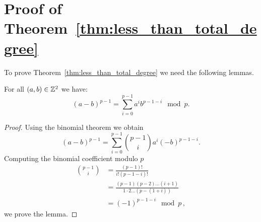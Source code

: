 \section{Proof of Theorem~\ref{thm:less_than_total_degree}}
\label{app:proof_thm_less_than_total_degree}
To prove Theorem~\ref{thm:less_than_total_degree} we need the following lemmas.
  \begin{lemma}\label{lem:difference_to_p-1}
    For all $(a,b)\in\mathbb{Z}^2$ we have:
    \[
      (a - b)^{p-1} = \sum_{i=0}^{p-1} a^i b^{p-1-i} \mod p.
    \]
  \end{lemma}
  \begin{proof}
    Using the binomial theorem we obtain
    \[
      (a - b)^{p-1} = \sum_{i=0}^{p-1} \binom{p-1}{i} a^i (-b)^{p-1-i}.
    \]
    Computing the binomial coefficient modulo $p$
    \begin{align*}
      \binom{p-1}{i} & = \frac{(p-1)!}{i! (p-1-i)!} \\
      & = \frac{(p-1)(p-2)\dots(i+1)}{1 \cdot 2 \dots (p-(1+i))} \\
      &= (-1)^{p-1-i} \mod p\,,
    \end{align*}
    we prove the lemma.
  \end{proof}

